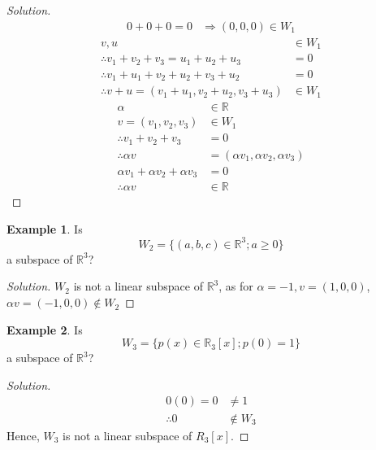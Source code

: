 \documentclass[fleqn, a4paper, 12pt]{article}
\theoremstyle{definition}
\newtheorem{example}{Example}
\theoremstyle{theorem}
\newenvironment{solution}
{\begin{proof}[Solution]\let\qed\relax}
	{\end{proof}}
\begin{document}
\begin{solution}
	\begin{align*}
		0 + 0 + 0 = 0 &\Rightarrow (0, 0, 0) \in W_1
	\end{align*}
	\begin{align*}
		v, u &\in W_1\\
		\therefore v_1 + v_2 + v_3 = u_1 + u_2 + u_3 &= 0 \\
		\therefore v_1 + u_1 + v_2 + u_2 + v_3 + u_2 &= 0 \\
		\therefore v+u = (v_1 + u_1, v_2 + u_2, v_3 + u_3) &\in W_1
	\end{align*}
	\begin{align*}
		\alpha &\in \mathbb{R} \\
		v = (v_1, v_2, v_3) &\in W_1 \\
		\therefore v_1 + v_2 + v_3 &= 0 \\
		\therefore \alpha v &= (\alpha v_1, \alpha v_2, \alpha v_3) \\
		\alpha v_1 + \alpha v_2 + \alpha v_3 &= 0 \\
		\therefore \alpha v &\in \mathbb{R}
	\end{align*}
	\end{solution}

	\begin{example}
		Is
		\begin{equation*}
		W_2 = \{(a, b, c) \in \mathbb{R}^3 ; a \geq 0\}
		\end{equation*}
		a subspace of $\mathbb{R}^3$?
	\end{example}

	\begin{solution}
		$W_2$ is not a linear subspace of $\mathbb{R}^3$, as for $\alpha = -1, v = (1, 0, 0)$, $\alpha v = (-1, 0, 0) \notin W_2$
	\end{solution}
	
	\begin{example}
		Is
		\begin{equation*}
		W_3 = \{p(x) \in \mathbb{R}_3[x] ; p(0) = 1\}
		\end{equation*}
		a subspace of $\mathbb{R}^3$?
	\end{example}
	
	\begin{solution}
		\begin{align*}
			0(0) = 0 &\neq 1 \\
			\therefore 0 &\notin W_3
		\end{align*}
		Hence, $W_3$ is not a linear subspace of $R_3[x]$.
	\end{solution}
	
\end{document}
